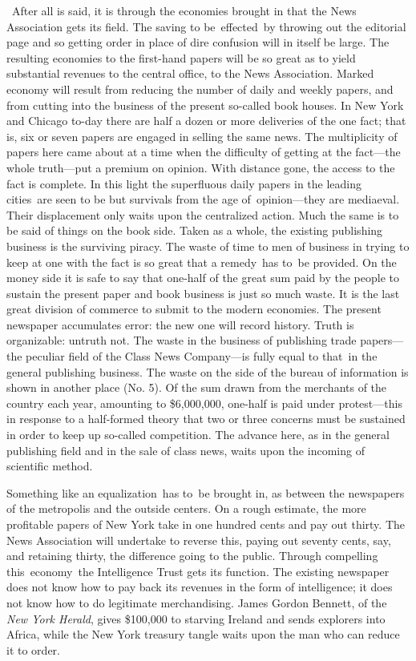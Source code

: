 \documentclass[twoside,symmetric,nobib,justified]{tufte-book}
\begin{document}
~After all is said, it is through the economies brought in that the News
Association gets its field. The saving to be~effected~by throwing out
the editorial page and so getting order in place of dire confusion will
in itself be large. The resulting economies to the first-hand papers
will be so great as to yield substantial revenues to the central office,
to the News Association. Marked economy will result from reducing the
number of daily and weekly papers, and from cutting into the business of
the present so-called book houses. In New York and Chicago to-day there
are half a dozen or more deliveries of the one fact; that is, six or
seven papers are engaged in selling the same news. The multiplicity of
papers here came about at a time when the difficulty of getting at the
fact---the whole truth---put a premium on opinion. With distance gone,
the access to the fact is complete. In this light the superfluous daily
papers in the leading cities~are seen to be but survivals from the age
of~opinion---they are mediaeval. Their displacement only waits upon the
centralized action. Much the same is to be said of things on the book
side. Taken as a whole, the existing publishing business is the
surviving piracy. The waste of time to men of business in trying to keep
at one with the fact is so great that a remedy~has to~be provided. On
the money side it is safe to say that one-half of the great sum paid by
the people to sustain the present paper and book business is just so
much waste. It is the last great division of commerce to submit to the
modern economies. The present newspaper accumulates error: the new one
will record history. Truth is organizable: untruth not. The waste in the
business of publishing trade papers---the peculiar field of the Class
News Company---is fully equal to that~in the general publishing
business. The waste on the side of the bureau of information is shown in
another place (No. 5). Of the sum drawn from the merchants of the
country each year, amounting to \$6,000,000, one-half is paid under
protest---this in response to a half-formed theory that two or three
concerns must be sustained in order to keep up so-called competition.
The advance here, as in the general publishing field and in the sale of
class news, waits upon the incoming of scientific method.~

Something like an equalization~has to~be brought in, as between the
newspapers of the metropolis and the outside centers. On a rough
estimate, the more profitable papers of New York take in one hundred
cents and pay out thirty. The News Association will undertake to reverse
this, paying out seventy cents, say, and retaining thirty, the
difference going to the public. Through compelling this~economy~the
Intelligence Trust gets its function. The existing newspaper does not
know how to pay back its revenues in the form of intelligence; it does
not know how to do legitimate merchandising. James Gordon Bennett, of
the \emph{New York Herald}, gives \$100,000 to starving Ireland and
sends explorers into Africa, while the New York treasury tangle waits
upon the man who can reduce it to order.~
\end{document}

